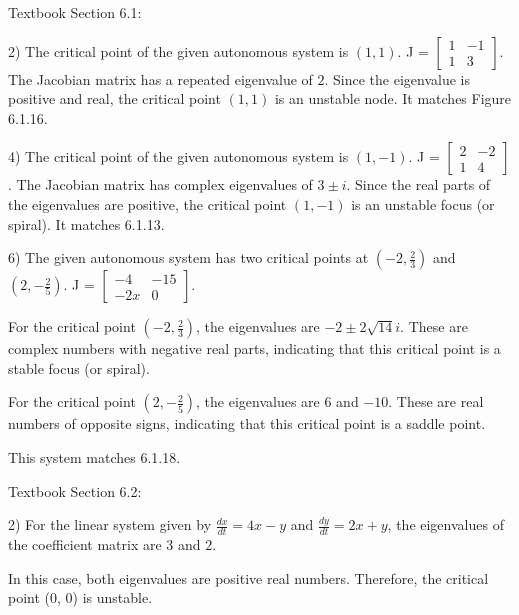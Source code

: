 \documentclass{article}
\begin{document}
Textbook Section 6.1:

2) The critical point of the given autonomous system is $(1, 1)$.
J = $\begin{bmatrix}
    1 & -1 \\
    1 & 3
\end{bmatrix}$.
The Jacobian matrix has a repeated eigenvalue of $2$.
Since the eigenvalue is positive and real, the critical point $(1, 1)$
is an unstable node. It matches Figure 6.1.16.

4) The critical point of the given autonomous system is $(1, -1)$.
J = $\begin{bmatrix}
    2 & -2 \\
    1 & 4
\end{bmatrix}$.
The Jacobian matrix has complex eigenvalues of $3 \pm i$.
Since the real parts of the eigenvalues are positive, the critical point
$(1, -1)$ is an unstable focus (or spiral). It matches 6.1.13.

6) The given autonomous system has two critical points at $(-2, \frac{2}{3})$
and $(2, -\frac{2}{5})$.
J = $\begin{bmatrix}
    -4 & -15 \\
    -2x & 0
\end{bmatrix}$.

For the critical point $(-2, \frac{2}{3})$, the eigenvalues
are $-2 \pm 2 \sqrt{14} i$.
These are complex numbers with negative real parts, indicating that
this critical point is a stable focus (or spiral).

For the critical point $(2, -\frac{2}{5})$, the eigenvalues are
$6$ and $-10$. These are real numbers of opposite signs, indicating that
this critical point is a saddle point.

This system matches 6.1.18.

Textbook Section 6.2:

2) For the linear system given by $\frac{dx}{dt} = 4x - y$ and
$\frac{dy}{dt} = 2x + y$, the eigenvalues of the coefficient matrix are
$3$ and $2$.

In this case, both eigenvalues are positive real numbers. Therefore, the
critical point (0, 0) is unstable.
\end{document}

